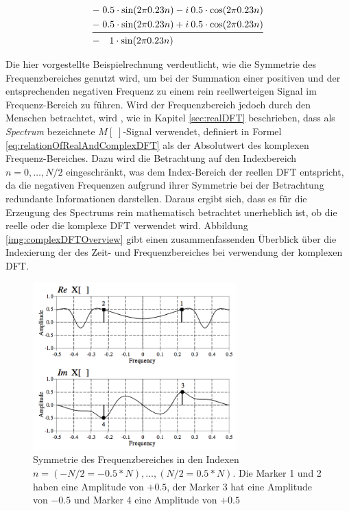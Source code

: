  \begin{equation}
 \begin{split}
-\; 0.5 \cdot \sin(2  \pi 0.23 n) - i \: 0.5 \cdot \cos(2  \pi 0.23 n) \\
-\; 0.5 \cdot \sin(2  \pi 0.23 n) + i \:  0.5 \cdot \cos(2  \pi 0.23 n) \\
\midrule
-\quad 1 \cdot  \sin (2  \pi 0.23 n) \qquad \qquad \qquad \qquad \quad \: \:
 \end{split}
 \label{eq:explainIDFTstep02}
 \end{equation}
 
Die hier vorgestellte Beispielrechnung verdeutlicht, wie die Symmetrie des Frequenzbereiches genutzt wird, um bei der Summation einer positiven und der entsprechenden negativen Frequenz zu einem rein reellwerteigen Signal im Frequenz-Bereich zu führen. Wird der Frequenzbereich jedoch durch den Menschen betrachtet, wird , wie in Kapitel \ref{sec:realDFT} beschrieben, dass als \emph{Spectrum} bezeichnete $M[\;]$-Signal verwendet, definiert in Formel \ref{eq:relationOfRealAndComplexDFT} als der Absolutwert des komplexen Frequenz-Bereiches. Dazu wird die Betrachtung auf den Indexbereich $n = 0 ,\ldots, N/2$ eingeschränkt, was dem Index-Bereich der reellen DFT entspricht, da die negativen Frequenzen aufgrund ihrer Symmetrie bei der Betrachtung redundante Informationen darstellen. Daraus ergibt sich, dass es für die Erzeugung des Spectrums rein mathematisch betrachtet unerheblich ist, ob die reelle oder die komplexe DFT verwendet wird. Abbildung \ref{img:complexDFTOverview} gibt einen zusammenfassenden Überblick über die Indexierung der des Zeit- und Frequenzbereiches bei verwendung der komplexen DFT. \cite[S. 225 - 226]{dspGuide}
 
 \begin{figure}[h]
 	\centering
 	\includegraphics[width=0.7\textwidth]{bilder/dftSymmetrie.png}
 	\caption{Symmetrie des Frequenzbereiches in den Indexen $n = (-N/2 = -0.5*N) ,\ldots ,  (N/2 = 0.5*N)$. Die Marker 1 und 2 haben eine Amplitude von $+0.5$, der Marker 3 hat eine Amplitude von $-0.5$ und Marker 4 eine Amplitude von $+0.5$ }
 	\label{img:symmetrieInDFT}
 \end{figure} 
 

